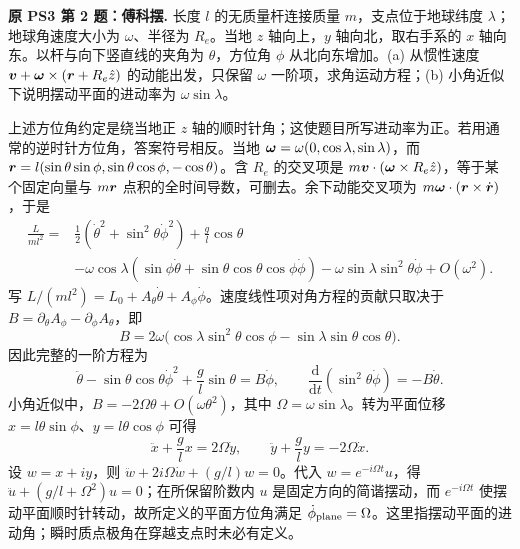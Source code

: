 \begin{example}
\textbf{原 PS3 第 2 题：傅科摆.} 
长度 $l$ 的无质量杆连接质量 $m$，支点位于地球纬度 $\lambda$；地球角速度大小为 $\omega$、半径为 $R_e$。当地 $z$ 轴向上，$y$ 轴向北，取右手系的 $x$ 轴向东。以杆与向下竖直线的夹角为 $\theta$，方位角 $\phi$ 从北向东增加。(a) 从惯性速度 $\boldsymbol{v}+\boldsymbol{\omega}\times(\boldsymbol{r}+R_e\hat z)$ 的动能出发，只保留 $\omega$ 一阶项，求角运动方程；(b) 小角近似下说明摆动平面的进动率为 $\omega\sin\lambda$。
\end{example}
\begin{solution}
上述方位角约定是绕当地正 $z$ 轴的顺时针角；这使题目所写进动率为正。若用通常的逆时针方位角，答案符号相反。当地 $\boldsymbol{\omega}=\omega(0,\cos\lambda,\sin\lambda)$，而 $\boldsymbol{r}=l(\sin\theta\sin\phi,\sin\theta\cos\phi,-\cos\theta)$。含 $R_e$ 的交叉项是 $m\boldsymbol{v}\cdot(\boldsymbol{\omega}\times R_e\hat z)$，等于某个固定向量与 $m\boldsymbol{r}$ 点积的全时间导数，可删去。余下动能交叉项为 $m\boldsymbol{\omega}\cdot(\boldsymbol{r}\times\dot{\boldsymbol{r}})$，于是
\begin{align*}
 \frac{L}{ml^2}={}&\frac12(\dot\theta^2+\sin^2\theta\dot\phi^2)+\frac gl\cos\theta\\
 &-\omega\cos\lambda(\sin\phi\dot\theta+\sin\theta\cos\theta\cos\phi\dot\phi)
 -\omega\sin\lambda\sin^2\theta\dot\phi+O(\omega^2).
\end{align*}
写 $L/(ml^2)=L_0+A_\theta\dot\theta+A_\phi\dot\phi$。速度线性项对角方程的贡献只取决于 $B=\partial_\theta A_\phi-\partial_\phi A_\theta$，即
\[
 B=2\omega\bigl(\cos\lambda\sin^2\theta\cos\phi-\sin\lambda\sin\theta\cos\theta\bigr).
\]
因此完整的一阶方程为
\[
 \ddot\theta-\sin\theta\cos\theta\dot\phi^2+\frac gl\sin\theta=B\dot\phi,\qquad
 \frac{\mathrm d}{\mathrm dt}(\sin^2\theta\dot\phi)=-B\dot\theta.
\]
小角近似中，$B=-2\Omega\theta+O(\omega\theta^2)$，其中 $\Omega=\omega\sin\lambda$。转为平面位移 $x=l\theta\sin\phi$、$y=l\theta\cos\phi$ 可得
\[
 \ddot x+\frac gl x=2\Omega\dot y,\qquad
 \ddot y+\frac gl y=-2\Omega\dot x.
\]
设 $w=x+iy$，则 $\ddot w+2i\Omega\dot w+(g/l)w=0$。代入 $w=e^{-i\Omega t}u$，得 $\ddot u+(g/l+\Omega^2)u=0$；在所保留阶数内 $u$ 是固定方向的简谐摆动，而 $e^{-i\Omega t}$ 使摆动平面顺时针转动，故所定义的平面方位角满足 $\dot\phi_{\rm plane}=\Omega$。这里指摆动平面的进动角；瞬时质点极角在穿越支点时未必有定义。
\end{solution}

